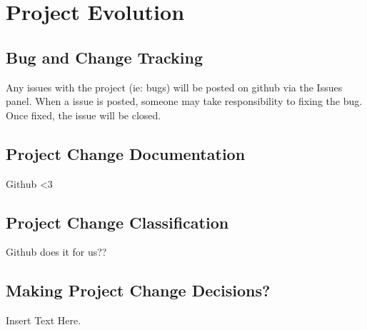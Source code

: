 \documentclass [12pt]{article}
\begin{document}
\section{Project Evolution}

\subsection{Bug and Change Tracking}
Any issues with the project (ie: bugs) will  be posted on github via the Issues panel. When a issue is posted, someone may take responsibility to fixing the bug. Once fixed, the issue will be closed.

\subsection{Project Change Documentation}
Github <3

\subsection{Project Change Classification}
Github does it for us??

\subsection{Making Project Change Decisions?} 
Insert Text Here.


\end{document}
